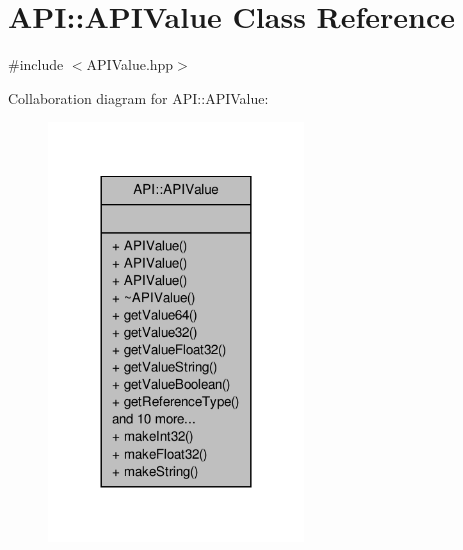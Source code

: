 \hypertarget{class_a_p_i_1_1_a_p_i_value}{\section{A\-P\-I\-:\-:A\-P\-I\-Value Class Reference}
\label{class_a_p_i_1_1_a_p_i_value}
}


{\ttfamily \#include $<$A\-P\-I\-Value.\-hpp$>$}



Collaboration diagram for A\-P\-I\-:\-:A\-P\-I\-Value\-:
\nopagebreak
\begin{figure}[H]
\begin{center}
\leavevmode
\includegraphics[width=192pt]{class_a_p_i_1_1_a_p_i_value__coll__graph}
\end{center}
\end{figure}
